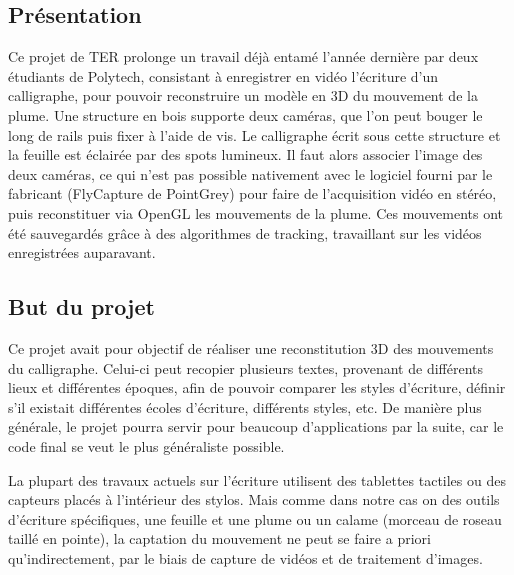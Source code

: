\subsection{Présentation}

Ce projet de TER prolonge un travail déjà entamé l'année dernière par deux étudiants de Polytech, consistant à enregistrer en vidéo l'écriture d'un calligraphe, pour pouvoir reconstruire un modèle en 3D du mouvement de la plume. Une structure en bois supporte deux caméras, que l'on peut bouger le long de rails puis fixer à l'aide de vis. Le calligraphe écrit sous cette structure et la feuille est éclairée par des spots lumineux. Il faut alors associer l'image des deux caméras, ce qui n'est pas possible nativement avec le logiciel fourni par le fabricant (FlyCapture de PointGrey) pour faire de l'acquisition vidéo en stéréo, puis reconstituer via OpenGL les mouvements de la plume. Ces mouvements ont été sauvegardés grâce à des algorithmes de tracking, travaillant sur les vidéos enregistrées auparavant.



\subsection{But du projet}

Ce projet avait pour objectif de réaliser une reconstitution 3D des mouvements du calligraphe. Celui-ci peut recopier plusieurs textes, provenant de différents lieux et différentes époques, afin de pouvoir comparer les styles d'é\-cri\-tu\-re, définir s'il existait différentes écoles d'écriture, différents styles, etc. De manière plus générale, le projet pourra servir pour beaucoup d'applications par la suite, car le code final se veut le plus généraliste possible.

La plupart des travaux actuels sur l'écriture utilisent des tablettes tactiles ou des capteurs placés à l'intérieur des stylos. Mais comme dans notre cas on des outils d'écriture spécifiques, une feuille et une plume ou un calame (morceau de roseau taillé en pointe), la captation du mouvement ne peut se faire a priori qu'indirectement, par le biais de capture de vidéos et de traitement d'images.